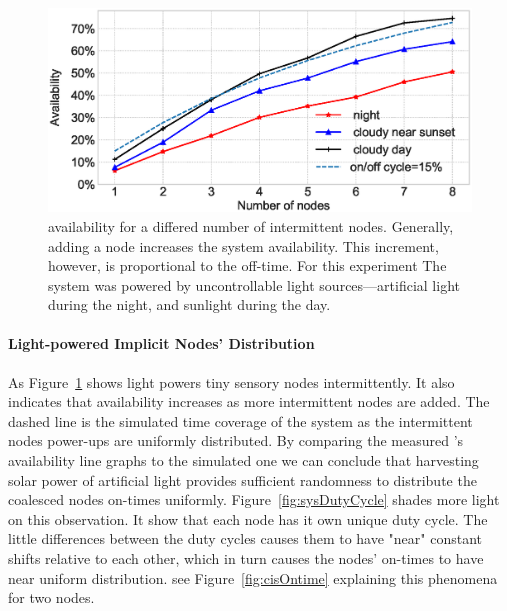 \begin{figure}[t]
		\centering
		\includegraphics[width=\columnwidth]{figures/sysAvailability}
		\caption{\fullsys availability for a differed number of intermittent nodes. Generally, adding a node increases the system availability. This increment, however, is proportional to the \sys off-time. For this experiment The system was powered by uncontrollable light sources---artificial light during the night, and sunlight during the day.}
		\label{fig:solarPwrCoIS}
\end{figure} 

\paragraph{Light-powered Implicit Nodes' Distribution}
As Figure~\ref{fig:solarPwrCoIS} shows light powers tiny sensory nodes intermittently. It also indicates that \sys availability increases as more intermittent nodes are added. The dashed line is the simulated time coverage of the system as the intermittent nodes power-ups are uniformly distributed. By comparing the measured \sys's availability line graphs to the simulated one we can conclude that harvesting solar power of artificial light provides sufficient randomness to distribute the coalesced nodes on-times uniformly. Figure~\ref{fig:sysDutyCycle} shades more light on this observation. It show that each node has it own unique duty cycle. The little differences between the duty cycles causes them to have "near" constant shifts relative to each other, which in turn causes the \sys nodes' on-times to have near uniform distribution. see Figure~\ref{fig:cisOntime} explaining this phenomena for two nodes.


